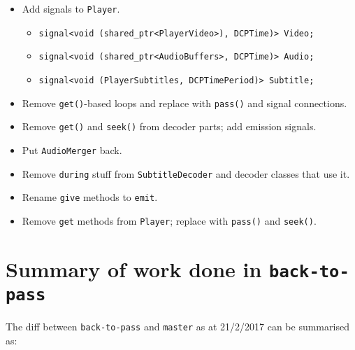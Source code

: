 \documentclass{article}
\begin{document}
\begin{itemize}
\item Add signals to \texttt{Player}.
  \begin{itemize}
    \item \texttt{signal<void (shared\_ptr<PlayerVideo>), DCPTime)> Video;}
    \item \texttt{signal<void (shared\_ptr<AudioBuffers>, DCPTime)> Audio;}
    \item \texttt{signal<void (PlayerSubtitles, DCPTimePeriod)> Subtitle;}
  \end{itemize}
  \item Remove \texttt{get()}-based loops and replace with \texttt{pass()} and signal connections.
  \item Remove \texttt{get()} and \texttt{seek()} from decoder parts; add emission signals.
  \item Put \texttt{AudioMerger} back.
  \item Remove \texttt{during} stuff from \texttt{SubtitleDecoder} and decoder classes that use it.
  \item Rename \texttt{give} methods to \texttt{emit}.
  \item Remove \texttt{get} methods from \texttt{Player}; replace with \texttt{pass()} and \texttt{seek()}.
\end{itemize}


\section{Summary of work done in \texttt{back-to-pass}}

The diff between \texttt{back-to-pass} and \texttt{master} as at 21/2/2017 can be summarised as:
\end{document}
